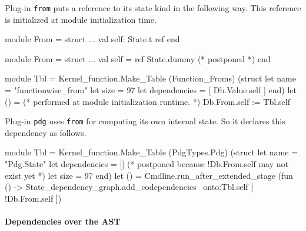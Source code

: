 \begin{example}
Plug-in \texttt{from} puts a reference to its state kind in the
following way. This reference is initialized at module initialization time.

\begin{ocamlcode}
module From = struct
  ...
  val self: State.t ref
end
\end{ocamlcode}

\begin{ocamlcode}
module From = struct
  ...
  val self = ref State.dummy (* postponed *)
end
\end{ocamlcode}

\begin{ocamlcode}
module Tbl =
  Kernel_function.Make_Table
    (Function_Froms)
    (struct
       let name = "functionwise_from"
       let size = 97
       let dependencies = [ Db.Value.self ]
     end)
let () =
  (* performed at module initialization runtime. *)
  Db.From.self := Tbl.self
\end{ocamlcode}
Plug-in \texttt{pdg} uses
\texttt{from} for computing its own internal state. So it declares
this dependency as follows.

\begin{ocamlcode}
module Tbl =
  Kernel_function.Make_Table
    (PdgTypes.Pdg)
    (struct
       let name = "Pdg.State"
       let dependencies = [] (* postponed because !Db.From.self may
                                not exist yet *)
       let size = 97
    end)
let () =
  Cmdline.run_after_extended_stage
    (fun () ->
       State_dependency_graph.add_codependencies
         ~onto:Tbl.self
         [ !Db.From.self ])
\end{ocamlcode}
\end{example}

\paragraph{Dependencies over the AST}

